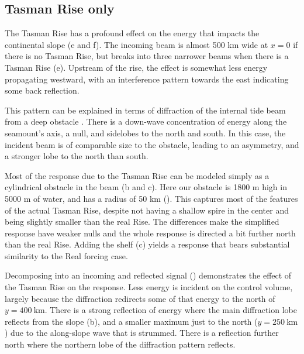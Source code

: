 \documentclass[10pt]{article}
\newcommand{\tempS}[1]{}
\newcommand{\mn}[1]{{\sc #1}}
\begin{document}
\subsection{Tasman Rise only}

The Tasman Rise has a profound effect on the energy that impacts the continental slope (e and f).  The incoming beam is almost 500 km wide at $x=0$ if there is no Tasman Rise, but breaks into three narrower beams when there is a Tasman Rise (e).  Upstream of the rise, the effect is somewhat less energy propagating westward, with an  interference pattern towards the east indicating some back reflection.  



This pattern can be explained in terms of diffraction of the internal tide beam from a deep obstacle \citep[i.e.][]{johnstonetal03}.  There is a down-wave concentration of energy along the seamount's axis, a null, and sidelobes to the north and south.  In this case, the incident beam is of comparable size to the obstacle, leading to an asymmetry, and a stronger lobe to the north than south.  

Most of the response due to the Tasman Rise can be modeled simply as a cylindrical obstacle in the beam (b and c).  Here our obstacle is 1800 m high in 5000 m of water, and has a radius of 50 km ().  This captures most of the features of the actual Tasman Rise, despite not having a shallow spire in the center and being slightly smaller than the real Rise.  The differences make the simplified response have weaker nulls and the whole response is directed a bit further north than the real Rise.  Adding the shelf (c) yields a response that bears substantial similarity to the \mn{Real} forcing case.  

Decomposing into an incoming and reflected signal () demonstrates the effect of the Tasman Rise on the response.  Less energy is incident on the control volume, largely because the diffraction redirects some of that energy to the north of $y=400\ \mathrm{km}$.  There is a strong reflection of energy where the main diffraction lobe reflects from the slope (b), and a smaller maximum just to the north ($y=250\ \mathrm{km}$) due to the along-slope wave that is strummed.  There is a reflection further north where the northern lobe of the diffraction pattern reflects.  
\end{document}
